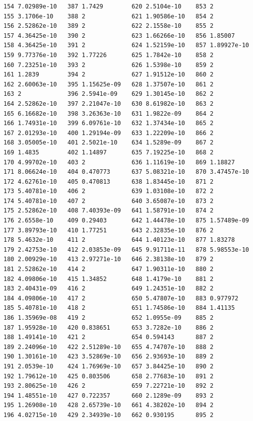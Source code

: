 \documentclass{article}
\begin{document}
\begin{verbatim}
154 7.02989e-10   387 1.7429        620 2.5104e-10    853 2
155 3.1706e-10    388 2             621 1.90586e-10   854 2
156 2.52862e-10   389 2             622 2.1558e-10    855 2
157 4.36425e-10   390 2             623 1.66266e-10   856 1.85007
158 4.36425e-10   391 2             624 1.52159e-10   857 1.89927e-10
159 9.77376e-10   392 1.77226       625 1.7842e-10    858 2
160 7.23251e-10   393 2             626 1.5398e-10    859 2
161 1.2839        394 2             627 1.91512e-10   860 2
162 2.60063e-10   395 1.15625e-09   628 1.37507e-10   861 2
163 2             396 2.5941e-09    629 1.30145e-10   862 2
164 2.52862e-10   397 2.21047e-10   630 8.61982e-10   863 2
165 6.16682e-10   398 3.26363e-10   631 1.9822e-09    864 2
166 1.74931e-10   399 6.09761e-10   632 1.37434e-10   865 2
167 2.01293e-10   400 1.29194e-09   633 1.22209e-10   866 2
168 3.05005e-10   401 2.5021e-10    634 1.5289e-09    867 2
169 1.4835        402 1.14897       635 7.19225e-10   868 2
170 4.99702e-10   403 2             636 1.11619e-10   869 1.18827
171 8.06624e-10   404 0.470773      637 5.08321e-10   870 3.47457e-10
172 4.62761e-10   405 0.470813      638 1.83445e-10   871 2
173 5.40781e-10   406 2             639 1.03108e-10   872 2
174 5.40781e-10   407 2             640 3.65087e-10   873 2
175 2.52862e-10   408 7.40393e-09   641 1.58791e-10   874 2
176 2.6558e-10    409 0.29403       642 1.44478e-10   875 1.57489e-09
177 3.89793e-10   410 1.77251       643 2.32835e-10   876 2
178 5.4632e-10    411 2             644 1.40123e-10   877 1.83278
179 2.42753e-10   412 2.03853e-09   645 9.91711e-11   878 5.98553e-10
180 2.00929e-10   413 2.97271e-10   646 2.38138e-10   879 2
181 2.52862e-10   414 2             647 1.90311e-10   880 2
182 4.09806e-10   415 1.34852       648 1.4179e-10    881 2
183 2.40431e-09   416 2             649 1.24351e-10   882 2
184 4.09806e-10   417 2             650 5.47807e-10   883 0.977972
185 5.40781e-10   418 2             651 1.74586e-10   884 1.41135
186 1.35969e-08   419 2             652 1.0955e-09    885 2
187 1.95928e-10   420 0.838651      653 3.7282e-10    886 2
188 1.49141e-10   421 2             654 0.594143      887 2
189 2.24096e-10   422 2.51289e-10   655 4.74707e-10   888 2
190 1.30161e-10   423 3.52869e-10   656 2.93693e-10   889 2
191 2.0539e-10    424 1.76969e-10   657 3.84425e-10   890 2
192 1.79612e-10   425 0.803506      658 2.77683e-10   891 2
193 2.80625e-10   426 2             659 7.22721e-10   892 2
194 1.48551e-10   427 0.722357      660 2.1289e-09    893 2
195 1.26908e-10   428 2.65739e-10   661 4.38202e-10   894 2
196 4.02715e-10   429 2.34939e-10   662 0.930195      895 2

\end{verbatim}
\end{document}
